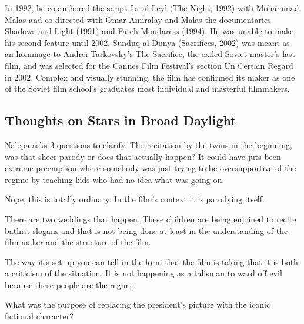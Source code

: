 \documentclass{article}
\begin{document}
\vspace{5mm}

In 1992, he co-authored the script for al-Leyl (The Night, 1992) with Mohammad Malas and co-directed with Omar Amiralay and Malas the documentaries Shadows and Light (1991) and Fateh Moudaress (1994). He was unable to make his second feature until 2002. Sunduq al-Dunya (Sacrifices, 2002) was meant as an hommage to Andreï Tarkovsky’s The Sacrifice, the exiled Soviet master’s last film, and was selected for the Cannes Film Festival’s section Un Certain Regard in 2002. Complex and visually stunning, the film has confirmed its maker as one of the Soviet film school’s graduates most individual and masterful filmmakers.


\vspace{5mm}


\subsection{Thoughts on Stars in Broad Daylight}

\vspace{5mm}

Nalepa asks 3 questions to clarify.  The recitation by the twins in the beginning, was that sheer parody or does that actually happen?  It could have juts been extreme preemption where somebody was just trying to be oversupportive of the regime by teaching kids who had no idea what was going on.  

\vspace{5mm}

Nope, this is totally ordinary.  In the film's context it is parodying itself.  

\vspace{5mm}

There are two weddings that happen.  These children are being enjoined to recite bathist slogans and that is not being done at least in the understanding of the film maker and the structure of the film.  

\vspace{5mm}

The way it's set up you can tell in the form that the film is taking that it is both a criticism of the situation.  It is not happening as a talisman to ward off evil because these people are the regime.  

\vspace{5mm}

What was the purpose of replacing the president's picture with the iconic fictional character?  
\end{document}
